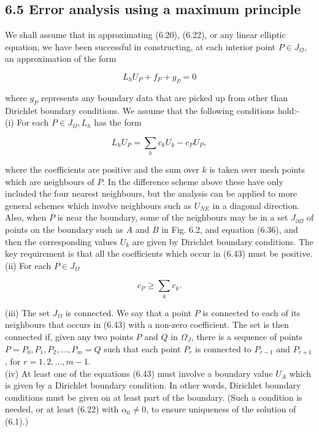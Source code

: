 \documentclass[10pt]{article}
\begin{document}
\subsection*{6.5 Error analysis using a maximum principle}
We shall assume that in approximating (6.20), (6.22), or any linear elliptic equation, we have been successful in constructing, at each interior point \(P \in J_{\Omega}\), an approximation of the form

\[
L_{h} U_{P}+f_{P}+g_{P}=0
\]

where \(g_{P}\) represents any boundary data that are picked up from other than Dirichlet boundary conditions. We assume that the following conditions hold:-\\
(i) For each \(P \in J_{\Omega}, L_{h}\) has the form

\[
L_{h} U_{P}=\sum_{k} c_{k} U_{k}-c_{P} U_{P},
\]

where the coefficients are positive and the sum over \(k\) is taken over mesh points which are neighbours of \(P\). In the difference scheme above these have only included the four nearest neighbours, but the analysis can be applied to more general schemes which involve neighbours such as \(U_{N E}\) in a diagonal direction. Also, when \(P\) is near the boundary, some of the neighbours may be in a set \(J_{\partial \Omega}\) of points on the boundary such as \(A\) and \(B\) in Fig. 6.2, and equation (6.36), and then the corresponding values \(U_{k}\) are given by Dirichlet boundary conditions. The key requirement is that all the coefficients which occur in (6.43) must be positive.\\
(ii) For each \(P \in J_{\Omega}\)

\[
c_{P} \geq \sum_{k} c_{k} .
\]

(iii) The set \(J_{\Omega}\) is connected. We say that a point \(P\) is connected to each of its neighbours that occurs in (6.43) with a non-zero coefficient. The set is then connected if, given any two points \(P\) and \(Q\) in \(\Omega_{J}\), there is a sequence of points \(P=P_{0}, P_{1}, P_{2}, \ldots, P_{m}=Q\) such that each point \(P_{r}\) is connected to \(P_{r-1}\) and \(P_{r+1}\), for \(r=1,2, \ldots, m-1\).\\
(iv) At least one of the equations (6.43) must involve a boundary value \(U_{A}\) which is given by a Dirichlet boundary condition. In other words, Dirichlet boundary conditions must be given on at least part of the boundary. (Such a condition is needed, or at least (6.22) with \(\alpha_{0} \neq 0\), to ensure uniqueness of the solution of (6.1).)
\end{document}
